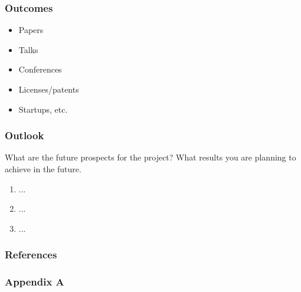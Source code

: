 \documentclass[aspectratio=169]{beamer}
\begin{document}


\begin{frame}
    \frametitle{Outcomes}
    
    \begin{itemize}
        \item Papers
        \item Talks
        \item Conferences
        \item Licenses/patents
        \item Startups, etc.
    \end{itemize}
    
\end{frame}


\begin{frame}
    \frametitle{Outlook}
    
    What are the future prospects for the project? What results you are planning to achieve in the future.
    \begin{enumerate}
        \item ...
        \item ...
        \item ...
    \end{enumerate}
    
\end{frame}



\begin{frame}

    \frametitle{References}
    
\end{frame}


\begin{frame}
    \frametitle{Appendix A}
    
\end{frame}
\end{document}
